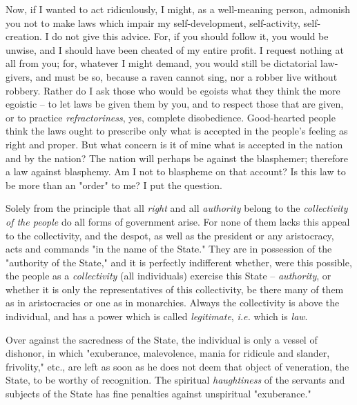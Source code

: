 Now, if I wanted to act ridiculously, I might, as a well-meaning person, 
admonish you not to make laws which impair my self-development, self-activity, 
self-creation. I do not give this advice. For, if you should follow it, you 
would be unwise, and I should have been cheated of my entire profit. I request 
nothing at all from you; for, whatever I might demand, you would still be 
dictatorial law-givers, and must be so, because a raven cannot sing, nor a 
robber live without robbery. Rather do I ask those who would be egoists what 
they think the more egoistic -- to let laws be given them by you, and to 
respect those that are given, or to practice \textit{refractoriness}, yes, 
complete disobedience. Good-hearted people think the laws ought to prescribe 
only what is accepted in the people's feeling as right and proper. But what 
concern is it of mine what is accepted in the nation and by the nation? The 
nation will perhaps be against the blasphemer; therefore a law against 
blasphemy. Am I not to blaspheme on that account? Is this law to be more than 
an "{}order"{} to me? I put the question.

Solely from the principle that all \textit{right} and all \textit{authority} 
belong to the \textit{collectivity of the people} do all forms of government 
arise. For none of them lacks this appeal to the collectivity, and the despot, 
as well as the president or any aristocracy, acts and commands "{}in the name 
of the State."{} They are in possession of the "{}authority of the State,"{} 
and it is perfectly indifferent whether, were this possible, the people as a 
\textit{collectivity} (all individuals) exercise this State -- 
\textit{authority}, or whether it is only the representatives of this 
collectivity, be there many of them as in aristocracies or one as in 
monarchies. Always the collectivity is above the individual, and has a power 
which is called \textit{legitimate}, \textit{i.e.} which is \textit{law}.

Over against the sacredness of the State, the individual is only a vessel of 
dishonor, in which "{}exuberance, malevolence, mania for ridicule and slander, 
frivolity,"{} etc., are left as soon as he does not deem that object of 
veneration, the State, to be worthy of recognition. The spiritual 
\textit{haughtiness} of the servants and subjects of the State has fine 
penalties against unspiritual "{}exuberance."{}

